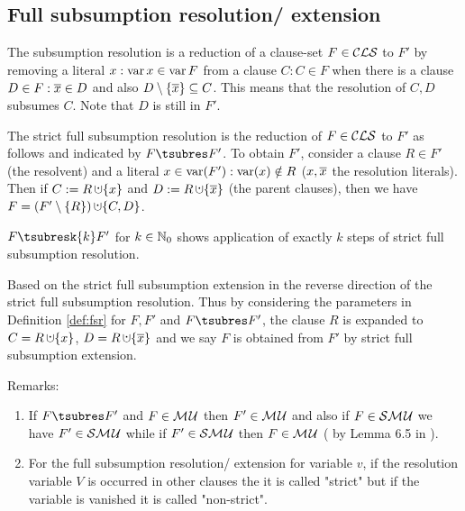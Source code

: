 \documentclass{report}
\begin{document}
\subsection{Full subsumption resolution/ extension}
\label{sec:fsr-e}  

\begin{defi}\label{def:sres}
The subsumption resolution is a reduction of a clause-set $F \in \mathcal{CLS}$ to $F'$ by removing a literal $x : \operatorname{var}{x} \in \operatorname{var}{F}$ from a clause $C:C \in F$ when there is a clause $D \in F: \overline x \in D$ and also $D \setminus \{ \overline x \} \subseteq C$. This means that the resolution of $C,D$ subsumes $C$. Note that $D$ is still in $F'$.
\end{defi}

\begin{defi}\label{def:fsr}
\cite{h9} The strict full subsumption resolution is the reduction of $F \in \mathcal{CLS}$ to $F'$ as follows and indicated by $F \tsubres F'$. To obtain $F'$, consider a clause $R \in F'$ (the resolvent) and a literal $x \in \operatorname{var}(F'):\operatorname{var}(x) \notin R$ ($x, \overline{x}$ the resolution literals). Then if $C := R \addcup \set{x}$ and $D := R \addcup \set{\ol{x}}$ (the parent clauses), then we have $F = (F' \sm \set{R}) \addcup \set{C,D}$.

$F \tsubresk{k} F'$ for $k \in \mathbb{N}_0$ shows application of exactly $k$ steps of strict full subsumption resolution. 
\end{defi}
   
\begin{defi}\label{def:fse}
Based on \cite{h9} the strict full subsumption extension in the reverse direction of the strict full subsumption resolution. Thus by considering the parameters in Definition \ref{def:fsr} for $F, F'$ and $F \tsubres F'$, the clause $R$ is expanded to $C = R \addcup \set{x}$, $D = R \addcup \set{\ol{x}}$ and we say $F$ is obtained from $F'$ by strict full subsumption extension.
\end{defi}
Remarks:
  \begin{enumerate}
  \item If  $F \tsubres F'$ and $F \in \mathcal{M\hspace{0.8pt}U} $ then $ F' \in \mathcal{M\hspace{0.8pt}U}$ and also if $F \in \mathcal{S}\mathcal{M\hspace{0.8pt}U}$ we have $ F' \in \mathcal{S}\mathcal{M\hspace{0.8pt}U}$ while if $ F' \in \mathcal{S}\mathcal{M\hspace{0.8pt}U}$ then $F \in \mathcal{M\hspace{0.8pt}U} $ ( by Lemma 6.5 in \cite{h9}). 
  \item For the full subsumption resolution/ extension for variable $v$, if the resolution variable $V$ is occurred in other clauses the it is called "strict" but if the variable is vanished it is called "non-strict".
  \end{enumerate}
\end{document}

